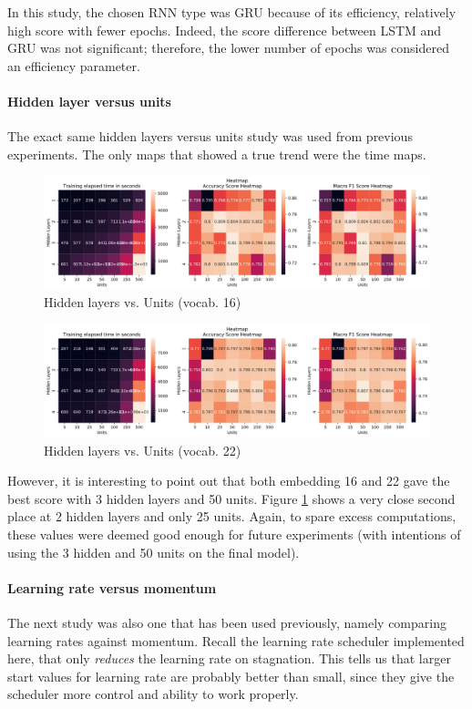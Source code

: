 In this study, the chosen RNN type was GRU because of its efficiency, relatively high score with fewer epochs. Indeed, the score difference between LSTM and GRU was not significant; therefore, the lower number of epochs was considered an efficiency parameter.

\paragraph{Hidden layer versus units}
The exact same hidden layers versus units study was used from previous experiments. The only maps that showed a true trend were the time maps.

\begin{figure}[H]
    \centering
    \includegraphics[width=1\linewidth]{pictures/ex6_heatmap_16_HLUnits.png}
    \caption{Hidden layers vs. Units (vocab. 16)}
    \label{fig:hlu_16_rnn}
\end{figure}

\begin{figure}[H]
    \centering
    \includegraphics[width=1\linewidth]{pictures/ex6_heatmap_22_HLUnits.png}
    \caption{Hidden layers vs. Units (vocab. 22)}
    \label{fig:hlu_22_rnn}
\end{figure}

However, it is interesting to point out that both embedding 16 and 22 gave the best score with 3 hidden layers and 50 units. Figure \ref{fig:hlu_16_rnn} shows a very close second place at 2 hidden layers and only 25 units. Again, to spare excess computations, these values were deemed good enough for future experiments (with intentions of using the 3 hidden and 50 units on the final model).

\paragraph{Learning rate versus momentum}
The next study was also one that has been used previously, namely comparing learning rates against momentum. Recall the learning rate scheduler implemented here, that only \textit{reduces} the learning rate on stagnation. This tells us that larger start values for learning rate are probably better than small, since they give the scheduler more control and ability to work properly. 

